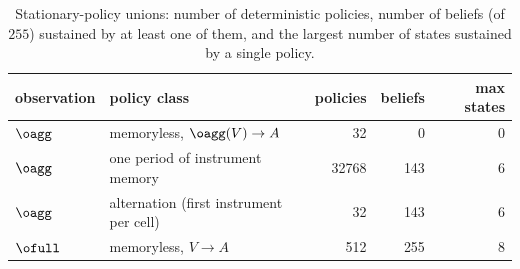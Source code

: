 \begin{table}[H]
\centering\small
\caption{Stationary-policy unions: number of deterministic policies, number of beliefs (of $255$) sustained by at least one of them, and the largest number of states sustained by a single policy.}
\label{tab:stationary}
\begin{tabular}{llrrr}
\toprule
observation & policy class & policies & beliefs & max states \\
\midrule
$\oagg$ & memoryless, $\oagg(V)\to A$ & 32 & 0 & 0 \\
$\oagg$ & one period of instrument memory & 32768 & 143 & 6 \\
$\oagg$ & alternation (first instrument per cell) & 32 & 143 & 6 \\
$\ofull$ & memoryless, $V\to A$ & 512 & 255 & 8 \\
\bottomrule
\end{tabular}
\end{table}
